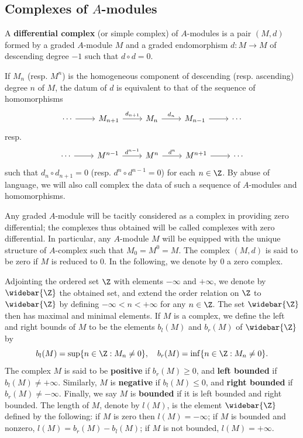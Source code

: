\subsection{Complexes of \texorpdfstring{$A$}{A}-modules}
A \textbf{differential complex} (or simple complex) of $A$-modules is a pair $(M,d)$ formed by a graded $A$-module $M$ and a graded endomorphism $d:M\to M$ of descending degree $-1$ such that $d\circ d=0$.\par
If $M_n$ (resp. $M^n$) is the homogeneous component of descending (resp. ascending) degree $n$ of $M$, the datum of $d$ is equivalent to that of the sequence of homomorphisms
\[\begin{tikzcd}
\cdots\ar[r]&M_{n+1}\ar[r,"d_{n+1}"]&M_n\ar[r,"d_n"]&M_{n-1}\ar[r]&\cdots
\end{tikzcd}\]
resp.
\[\begin{tikzcd}
\cdots\ar[r]&M^{n-1}\ar[r,"d^{n-1}"]&M^n\ar[r,"d^n"]&M^{n+1}\ar[r]&\cdots
\end{tikzcd}\]
such that $d_n\circ d_{n+1}=0$ (resp. $d^n\circ d^{n-1}=0$) for each $n\in\Z$. By abuse of language, we will also call complex the data of such a sequence of $A$-modules and homomorphisms.\par
Any graded $A$-module will be tacitly considered as a complex in providing zero differential; the complexes thus obtained will be called complexes with zero differential. In particular, any $A$-module $M$ will be equipped with the unique structure of $A$-complex such that $M_0=M^0=M$. The complex $(M,d)$ is said to be zero if $M$ is reduced to $0$. In the following, we denote by $0$ a zero complex.\par
Adjointing the ordered set $\Z$ with elements $-\infty$ and $+\infty$, we denote by $\widebar{\Z}$ the obtained set, and extend the order relation on $\Z$ to $\widebar{\Z}$ by defining $-\infty<n<+\infty$ for any $n\in\Z$. The set $\widebar{\Z}$ then has maximal and minimal elements. If $M$ is a complex, we define the left and right bounds of $M$ to be the elements $b_l(M)$ and $b_r(M)$ of $\widebar{\Z}$ by
\[b_l(M)=\sup\{n\in\Z:M_n\neq 0\},\quad b_r(M)=\inf\{n\in\Z:M_n\neq 0\}.\]
The complex $M$ is said to be \textbf{positive} if $b_r(M)\geq 0$, and \textbf{left bounded} if $b_l(M)\neq+\infty$. Similarly, $M$ is \textbf{negative} if $b_l(M)\leq 0$, and \textbf{right bounded} if $b_r(M)\neq-\infty$. Finally, we say $M$ is \textbf{bounded} if it is left bounded and right bounded. The length of $M$, denote by $l(M)$, is the element $\widebar{\Z}$ defined by the following: if $M$ is zero then $l(M)=-\infty$; if $M$ is bounded and nonzero, $l(M)=b_r(M)-b_l(M)$; if $M$ is not bounded, $l(M)=+\infty$.\par
